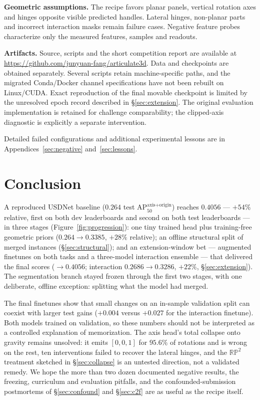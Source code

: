 \documentclass[11pt]{article}
\newcommand{\metric}{AP$_{50}^{\text{axis+origin}}$}
\begin{document}
\textbf{Geometric assumptions.} The recipe favors planar panels, vertical
rotation axes and hinges opposite visible predicted handles. Lateral hinges,
non-planar parts and incorrect interaction masks remain failure cases. Negative
feature probes characterize only the measured features, samples and readouts.

\textbf{Artifacts.} Source, scripts and the short competition report are
available at \url{https://github.com/junyuan-fang/articulate3d}. Data and
checkpoints are obtained separately. Several scripts retain machine-specific
paths, and the migrated Conda/Docker channel specifications have not been
rebuilt on Linux/CUDA. Exact reproduction of the final movable checkpoint is
limited by the unresolved epoch record described in \S\ref{sec:extension}.
The original evaluation implementation is retained for challenge comparability;
the clipped-axis diagnostic is explicitly a separate intervention.

Detailed failed configurations and additional experimental lessons are in
Appendices~\ref{sec:negative} and~\ref{sec:lessons}.

\section{Conclusion}

A reproduced USDNet baseline ($0.264$ test \metric{}) reaches $0.4056$ ---
$+54\%$ relative, first on both dev leaderboards and second on both test
leaderboards --- in three stages (Figure~\ref{fig:progression}): one tiny
trained head plus training-free geometric priors ($0.264 \to 0.3385$,
$+28\%$ relative); an offline structural split of merged instances
(\S\ref{sec:structural}); and an extension-window bet --- augmented
finetunes on both tasks and a three-model interaction ensemble --- that
delivered the final scores
($\to 0.4056$; interaction $0.2686 \to 0.3286$, $+22\%$,
\S\ref{sec:extension}). The segmentation branch stayed frozen through the
first two stages, with one deliberate, offline exception: splitting what
the model had merged.

The final finetunes show that small changes on an in-sample validation split
can coexist with larger test gains ($+0.004$ versus $+0.027$ for the
interaction finetune). Both models trained on validation, so these numbers
should not be interpreted as a controlled explanation of memorization.
The axis head's total collapse onto
gravity remains unsolved: it emits $[0,0,1]$ for $95.6\%$ of rotations and
is wrong on the rest, ten interventions failed to recover the lateral
hinges, and the $\mathbb{RP}^2$ treatment sketched in \S\ref{sec:collapse}
is an untested direction, not a validated remedy. We hope the more than two dozen documented negative results, the
freezing, curriculum and evaluation pitfalls, and the confounded-submission
postmortems of \S\ref{sec:confound} and \S\ref{sec:c2f} are as useful as the
recipe itself.
\end{document}
